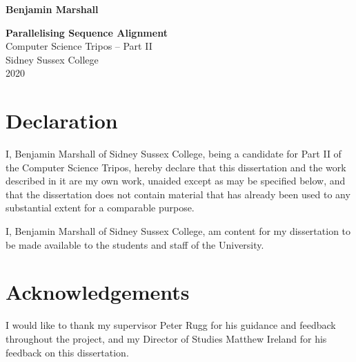 \documentclass[12pt,notitlepage]{report}
\begin{document}
%




\pagestyle{empty}

\hfill{\LARGE \bf Benjamin Marshall}

\vspace*{60mm}
\begin{center}
\Huge
{\bf Parallelising Sequence Alignment} \\
\vspace*{5mm}
\LARGE
Computer Science Tripos -- Part II \\
\vspace*{5mm}
Sidney Sussex College \\
\vspace*{5mm}
2020  %
\end{center}

\newpage

\pagestyle{plain}
\setcounter{page}{2}

\section*{Declaration}

I, Benjamin Marshall of Sidney Sussex College, being a candidate for Part II of
the Computer Science Tripos, hereby declare that this dissertation and the work
described in it are my own work, unaided except as may be specified below, and
that the dissertation does not contain material that has already been used to
any substantial extent for a comparable purpose.

I, Benjamin Marshall of Sidney Sussex College, am content for my dissertation to
be made available to the students and staff of the University.

\bigskip
{}

\medskip
{}

\section*{Acknowledgements}

I would like to thank my supervisor Peter Rugg for his guidance and feedback throughout the project, and my Director of Studies Matthew Ireland for his feedback on this dissertation.

\newpage

\end{document}
